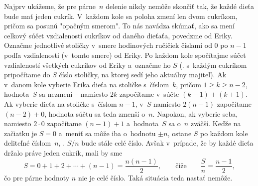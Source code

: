 {%
Najprv ukážeme, že pre párne~$n$ delenie nikdy nemôže skončiť tak, že každé dieťa bude mať jeden cukrík. V~každom kole sa poloha zmení len dvom cukríkom, pričom sa posunú "opačným smerom". To nás navádza skúmať, ako sa mení celkový súčet vzdialeností cukríkov od daného dieťaťa, povedzme od Eriky. Označme jednotlivé stoličky v~smere hodinových ručičiek číslami od 0 po $n-1$ podľa vzdialenosti (v~tomto smere) od Eriky. Po každom kole spočítajme súčet vzdialeností všetkých cukríkov od Eriky a~označme ho $S$ (\tj. s~každým cukríkom pripočítame do $S$ číslo stoličky, na ktorej sedí jeho aktuálny majiteľ). Ak v~danom kole vyberie Erika dieťa na stoličke s~číslom~$k$, pričom $1\ge k\ge n-2$, hodnota~$S$ sa nezmení -- namiesto $2k$ započítame v~súčte $(k-1)+(k+1)$. Ak vyberie dieťa na stoličke s~číslom $n-1$, v~$S$ namiesto $2(n-1)$ započítame $(n-2)+0$, hodnota súčtu sa teda zmenší o~$n$. Napokon, ak vyberie seba, namiesto $2\cdot0$ započítame $(n-1)+1$ a~hodnota~$S$ sa o~$n$ zväčší. Keďže na začiatku je $S=0$ a~meniť sa môže iba o~hodnotu $\pm n$, ostane $S$ po každom kole deliteľné číslom~$n$, \tj. $S/n$ bude stále celé číslo. Avšak v~prípade, že by každé dieťa držalo práve jeden cukrík, mali by sme
$$
  S=0+1+2+\cdots+(n-1)=\frac{n(n-1)}2,\qquad\text{čiže}\qquad
  \frac Sn=\frac{n-1}2,
$$
čo pre párne hodnoty $n$ nie je celé číslo. Taká situácia teda nastať nemôže.

}
